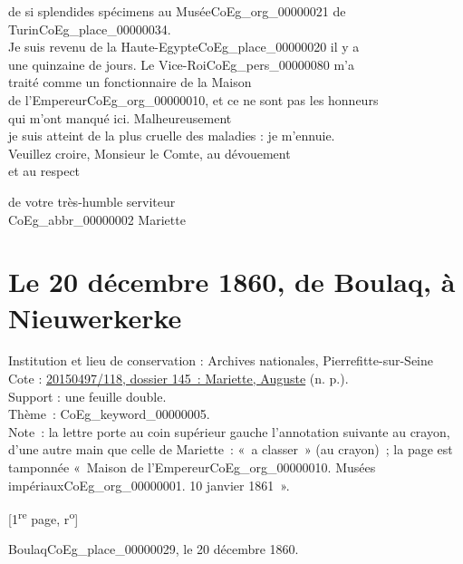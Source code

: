 \documentclass{book}
\begin{document}
de si splendides spécimens au Musée\gls{CoEg_org_00000021} de\\
Turin\gls{CoEg_place_00000034}.\\
\indent Je suis revenu de la Haute-Egypte\gls{CoEg_place_00000020} il y a\\
une quinzaine de jours. Le Vice-Roi\gls{CoEg_pers_00000080} m’a\\
traité comme un fonctionnaire de la Maison\\
de l’Empereur\gls{CoEg_org_00000010}, et ce ne sont pas les honneurs\\
qui m’ont manqué ici. Malheureusement\\
je suis atteint de la plus cruelle des maladies :
je m’ennuie.\\
\indent Veuillez croire, Monsieur le Comte, au dévouement\\
et au respect
\begin{center}\hspace{5cm} de votre très-humble serviteur\\
\hspace{5cm} \gls{CoEg_abbr_00000002} Mariette\end{center}
\hypertarget{CoEg_Mariette_1860-12-20}{}
\section*{Le 20 décembre 1860, de Boulaq, à Nieuwerkerke}  
{\footnotesize
\noindent Institution et lieu de conservation : Archives nationales, Pierrefitte-sur-Seine\\
Cote : \hyperlink{CoEg_Mariette_ms_001}{20150497/118, dossier 145~: Mariette, Auguste} (n. p.).\\
Support : une feuille double.\\
Thème~: \gls{CoEg_keyword_00000005}.\\
Note~: la lettre porte au coin supérieur gauche l’annotation suivante au crayon, d’une autre main que celle de Mariette~: «~a classer~» (au crayon)~; la page est tamponnée «~Maison de l’Empereur\gls{CoEg_org_00000010}. Musées impériaux\gls{CoEg_org_00000001}. 10 janvier 1861~».
\begin{center} {[1\textsuperscript{re} page, r\textsuperscript{o}]}\end{center}}
 
\begin{flushright}Boulaq\gls{CoEg_place_00000029}, le 20 décembre 1860.\end{flushright}
\end{document}
